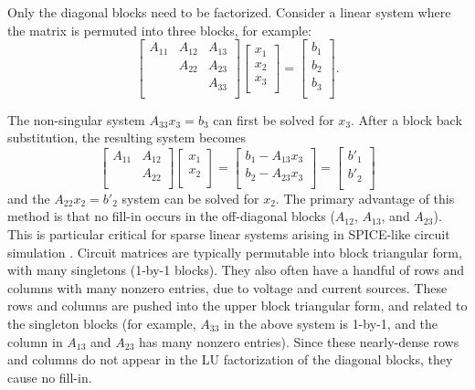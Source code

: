 \documentclass[11pt]{article}
\begin{document}
Only the diagonal blocks need to be factorized.  Consider a linear system where
the matrix is permuted into three blocks, for example:
\[
\left[
\begin{array}{ccc}
A_{11} & A_{12} & A_{13} \\
       & A_{22} & A_{23} \\
       &        & A_{33} \\
\end{array}
\right]
\left[
\begin{array}{c}
x_{1} \\
x_{2} \\
x_{3} \\
\end{array}
\right]
=
\left[
\begin{array}{c}
b_{1} \\
b_{2} \\
b_{3} \\
\end{array}
\right].
\]

The non-singular system $A_{33} x_{3} = b_{3}$ can first be solved for $x_{3}$.
After a block back substitution, the resulting system becomes
\[
\left[
\begin{array}{cc}
A_{11} & A_{12} \\
       & A_{22} \\
\end{array}
\right]
\left[
\begin{array}{c}
x_{1} \\
x_{2} \\
\end{array}
\right]
=
\left[
\begin{array}{c}
b_{1} - A_{13} x_{3}\\
b_{2} - A_{23} x_{3}\\
\end{array}
\right]
=
\left[
\begin{array}{c}
b'_{1} \\
b'_{2} \\
\end{array}
\right]
\]
and the $A_{22} x_{2} = b'_{2}$ system can be solved for $x_{2}$.  The primary
advantage of this method is that no fill-in occurs in the off-diagonal blocks
($A_{12}$, $A_{13}$, and $A_{23}$).  This is particular critical for sparse
linear systems arising in SPICE-like circuit simulation
\cite{Kundert86,KundertSangiovanniVincentelli85,NagelPederson,Quarles:M89/42}.
Circuit matrices are typically permutable into block triangular form, with many
singletons (1-by-1 blocks).  They also often have a handful of rows and columns
with many nonzero entries, due to voltage and current sources.  These rows and
columns are pushed into the upper block triangular form, and related to the
singleton blocks (for example, $A_{33}$ in the above system is 1-by-1, and the
column in $A_{13}$ and $A_{23}$ has many nonzero entries).  Since these
nearly-dense rows and columns do not appear in the LU factorization of the
diagonal blocks, they cause no fill-in.
\end{document}
